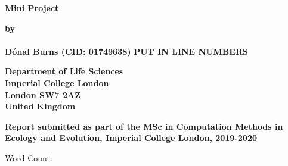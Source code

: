 \documentclass[a4paper]{article}
\newcommand\wordcount{}
\numberwithin{equation}{section}
\begin{document}
	\begin{titlepage}
		\thispagestyle{empty}
		\null\vskip0.2in
		\begin{center}
		\LARGE{{\bf 
		Mini Project}}
		\end{center}

		\vspace{0.5cm}

		\begin{center}
		{\Large {\bf by}}\\
		\mbox{} \\
		{\Large {\bf D\'onal Burns (CID: 01749638)}}
		\newline
		{\Large {\bf PUT IN LINE NUMBERS}}
		\end{center}

		\vspace{1cm}

		\begin{center}
		\large{\bf{Department of Life Sciences \\ Imperial College London \\
		London SW7 2AZ \\ United Kingdom}}
		\end{center}


		\vspace{1.5cm}

		\begin{figure}[!h]
		\centering
		\end{figure}

		\vspace{1.5cm}

		\begin{center}
		\large{\bf{Report submitted as part of the MSc in Computation Methods in Ecology and Evolution, Imperial College London, 2019-2020}}
		\end{center}

		\vspace{2cm}
		
		\begin{center}
		\large{Word Count: \wordcount}
		\end{center}


\end{titlepage}
%
%


\setcounter{tocdepth}{4}
\tableofcontents
\newpage
%
\fancyhead{}
\fancyfoot{}
\pagestyle{fancy} 
\fancyhead[RO,LE]{\sffamily\small \thepage}
\fancyhead[LO,RE]{\sffamily\small \nouppercase{\rightmark}}
\renewcommand{\headrulewidth}{0.4pt}
\renewcommand{\footrulewidth}{0.0pt}
%
%
%
%
\end{document}

